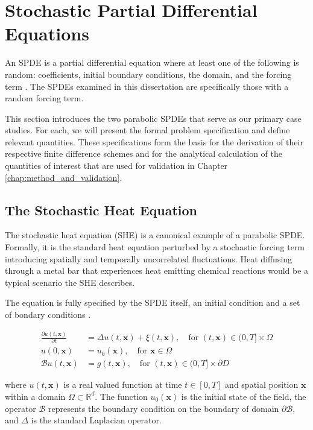 \section{Stochastic Partial Differential Equations}

An SPDE is a partial differential equation
where at least one of the following is random: coefficients, 
initial boundary conditions, the domain, and the forcing term 
\cite{lototsky2017stochastic}. The SPDEs examined in this dissertation
are specifically those with a random forcing term.

This section introduces the two parabolic SPDEs that 
serve as our primary case studies. For each, we 
will present the formal problem specification and define relevant 
quantities. These specifications form the basis for the derivation
of their respective finite difference schemes and for the analytical 
calculation of the quantities of interest that are used for 
validation in Chapter \ref{chap:method_and_validation}.

\subsection{The Stochastic Heat Equation}

The stochastic heat equation (SHE) is a canonical example of a parabolic SPDE.
Formally, it is the standard heat equation perturbed by a stochastic
forcing term introducing spatially and temporally uncorrelated 
fluctuations. Heat diffusing through a metal bar 
that experiences heat emitting chemical reactions would be a typical
scenario the SHE describes.

The equation is fully specified by the SPDE itself, an initial condition and 
a set of bondary conditions \cite{lototsky2017stochastic,pardoux2021stochastic}.

\begin{align}\label{eq:she_spde}
\frac{\partial u(t,\mathbf{x})}{\partial t} &= \Delta u(t,\mathbf{x}) + \xi(t,\mathbf{x}), 
\quad \text{for } (t, \mathbf{x}) \in (0, T] \times \Omega \tag{SHE} \\
u(0, \mathbf{x}) &= u_0(\mathbf{x}), \quad \text{for } \mathbf{x} \in \Omega \nonumber \\
\mathcal{B}u(t, \mathbf{x}) &= g(t, \mathbf{x}), \quad \text{for } 
(t, \mathbf{x}) \in (0, T] \times \partial D \nonumber
\end{align}

where $u(t,\mathbf{x})$ is a real valued function at time $t \in [0, T]$ and 
spatial position $\mathbf{x}$ within a domain $\Omega \subset \mathbb{R}^d$. 
The function $u_0(\mathbf{x})$ is the initial state of the field,
the operator $\mathcal{B}$ represents the boundary condition on the boundary of domain 
$\partial \mathcal{B}$, and $\Delta$ is the standard Laplacian operator.


